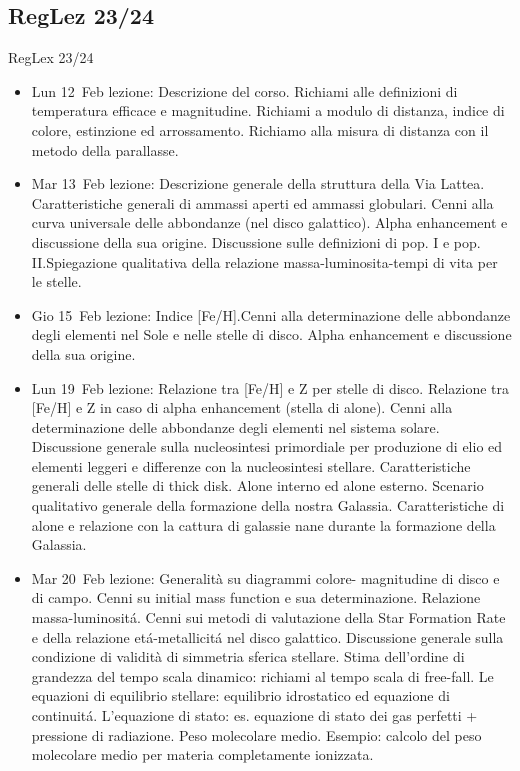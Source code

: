 \subsection{RegLez 23/24}

\begin{frame}[allowframebreaks]{RegLex 23/24}

\begin{itemize}
\item Lun 12 Feb lezione: Descrizione del corso. Richiami alle definizioni di temperatura efficace e magnitudine. Richiami a modulo di distanza, indice di colore, estinzione ed arrossamento. Richiamo alla misura di distanza con il metodo della parallasse. 
\item Mar 13 Feb lezione: Descrizione generale della struttura della Via Lattea. Caratteristiche generali di ammassi aperti ed ammassi globulari. Cenni alla curva universale delle abbondanze (nel disco galattico). Alpha enhancement e discussione della sua origine. Discussione sulle definizioni di pop. I e pop. II.Spiegazione qualitativa della relazione massa-luminosita-tempi di vita per le stelle. 
\item Gio 15 Feb lezione: Indice [Fe/H].Cenni alla determinazione delle abbondanze degli elementi nel Sole e nelle stelle di disco. Alpha enhancement e discussione della sua origine. 
\item Lun 19 Feb lezione: Relazione tra [Fe/H] e Z per stelle di disco. Relazione tra [Fe/H] e Z in caso di alpha enhancement (stella di alone). Cenni alla determinazione delle abbondanze degli elementi nel sistema solare. Discussione generale sulla nucleosintesi primordiale per produzione di elio ed elementi leggeri e differenze con la nucleosintesi stellare. Caratteristiche generali delle stelle di thick disk. Alone interno ed alone esterno. Scenario qualitativo generale della formazione della nostra Galassia. Caratteristiche di alone e relazione con la cattura di galassie nane durante la formazione della Galassia. 
\item Mar 20 Feb lezione: Generalità su diagrammi colore- magnitudine di disco e di campo. Cenni su initial mass function e sua determinazione. Relazione massa-luminosit\'a. Cenni sui metodi di valutazione della Star Formation Rate e della relazione et\'a-metallicit\'a nel disco galattico. Discussione generale sulla condizione di validità di simmetria sferica stellare. Stima dell'ordine di grandezza del tempo scala dinamico: richiami al tempo scala di free-fall. Le equazioni di equilibrio stellare: equilibrio idrostatico ed equazione di continuit\'a. L'equazione di stato: es. equazione di stato dei gas perfetti + pressione di radiazione. Peso molecolare medio. Esempio: calcolo del peso molecolare medio per materia completamente ionizzata. 

\end{itemize}
\end{frame}
